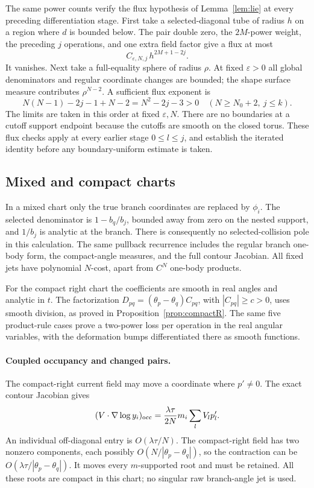 \documentclass[11pt]{article}
\numberwithin{equation}{section}
\theoremstyle{definition}
\newcommand{\eps}{\varepsilon}
\begin{document}
The same power counts verify the flux hypothesis of
Lemma~\ref{lem:lie} at every preceding differentiation stage.
First take a selected-diagonal tube of radius \(h\) on a region
where \(d\) is bounded below. The pair double zero, the
\(2M\)-power weight, the preceding \(j\) operations, and one
extra field factor give a flux at most
\[
 C_{\eps,N,j}\,h^{2M+1-2j}.
\]
It vanishes. Next take a full-equality sphere of radius \(\rho\).
At fixed \(\eps>0\) all global denominators and regular coordinate
changes are bounded; the shape surface measure contributes
\(\rho^{N-2}\). A sufficient flux exponent is
\[
 N(N-1)-2j-1+N-2=N^2-2j-3>0
 \quad(N\ge N_0+2,\ j\le k).
\]
The limits are taken in this order at fixed \(\eps,N\).
There are no boundaries at a cutoff support endpoint because
the cutoffs are smooth on the closed torus. These flux checks
apply at every earlier stage \(0\le l\le j\), and establish the
iterated identity before any boundary-uniform estimate is taken.

\subsection{Mixed and compact charts}
In a mixed chart only the true branch coordinates are replaced
by \(\phi_i\). The selected denominator is \(1-b_q/b_j\), bounded
away from zero on the nested support, and \(1/b_j\) is analytic
at the branch. There is consequently no selected-collision pole
in this calculation. The same pullback recurrence includes the
regular branch one-body form, the compact-angle measures, and
the full contour Jacobian. All fixed jets have polynomial
\(N\)-cost, apart from \(C^N\) one-body products.

For the compact right chart the coefficients are smooth in real
angles and analytic in \(t\). The factorization
\(D_{pq}=(\theta_p-\theta_q)C_{pq}\), with \(|C_{pq}|\ge c>0\),
uses smooth division, as proved in Proposition~\ref{prop:compactR}.
The same five product-rule cases prove a two-power loss per
operation in the real angular variables, with the deformation bumps
differentiated there as smooth functions.

\paragraph{Coupled occupancy and changed pairs.}
The compact-right current field may move a coordinate where
\(p'\ne0\). The exact contour Jacobian gives
\[
 (V\cdot\nabla\log y_i)_{\rm occ}
   =\frac{\lambda\tau}{2N}m_i\sum_l V_l p'_l.
\]
An individual off-diagonal entry is \(O(\lambda\tau/N)\).
The compact-right field has two nonzero components, each possibly
\(O(N/|\theta_p-\theta_q|)\), so the contraction can be
\(O(\lambda\tau/|\theta_p-\theta_q|)\). It moves every
\(m\)-supported root and must be retained. All these roots are
compact in this chart; no singular raw branch-angle jet is used.
\end{document}
